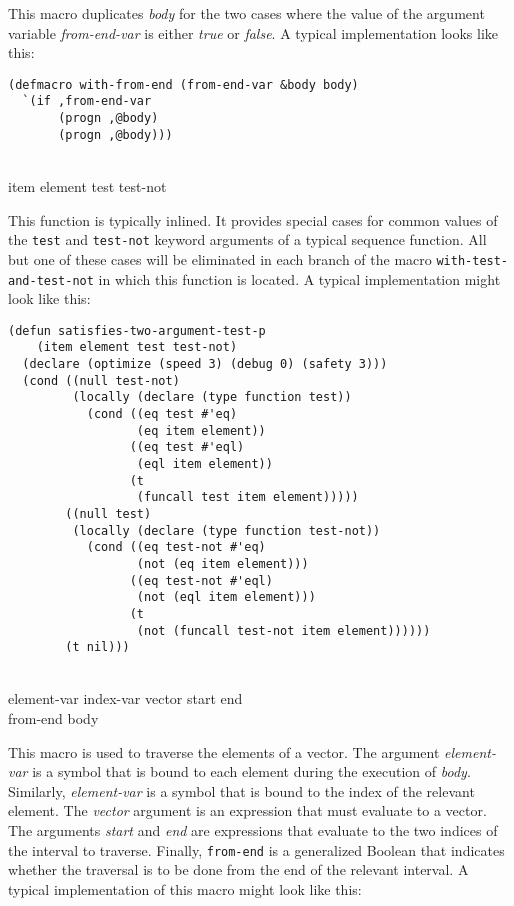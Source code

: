 This macro duplicates \textit{body} for the two cases where the value
of the argument variable \textit{from-end-var} is either \emph{true}
or \emph{false}.  A typical implementation looks like this:

{\small\begin{verbatim}
(defmacro with-from-end (from-end-var &body body)
  `(if ,from-end-var
       (progn ,@body)
       (progn ,@body)))
\end{verbatim}}
\noindent
{}\\
{item element test test-not}

This function is typically inlined.  It provides special cases for
common values of the \texttt{test} and \texttt{test-not} keyword
arguments of a typical sequence function.  All but one of these cases
will be eliminated in each branch of the macro
\texttt{with-test-and-test-not} in which this function is located.  A
typical implementation might look like this:

{\small\begin{verbatim}
(defun satisfies-two-argument-test-p
    (item element test test-not)
  (declare (optimize (speed 3) (debug 0) (safety 3)))
  (cond ((null test-not)
         (locally (declare (type function test))
           (cond ((eq test #'eq)
                  (eq item element))
                 ((eq test #'eql)
                  (eql item element))
                 (t
                  (funcall test item element)))))
        ((null test)
         (locally (declare (type function test-not))
           (cond ((eq test-not #'eq)
                  (not (eq item element)))
                 ((eq test-not #'eql)
                  (not (eql item element)))
                 (t
                  (not (funcall test-not item element))))))
        (t nil)))
\end{verbatim}}
\noindent
{}\\
{element-var index-var vector start end\\
from-end \body body}

This macro is used to traverse the elements of a vector.  The argument
\textit{element-var} is a symbol that is bound to each element during
the execution of \textit{body}.  Similarly, \textit{element-var} is a
symbol that is bound to the index of the relevant element.  The
\textit{vector} argument is an expression that must evaluate to a
vector.  The arguments \textit{start} and \textit{end} are expressions
that evaluate to the two indices of the interval to traverse.
Finally, \texttt{from-end} is a generalized Boolean that indicates
whether the traversal is to be done from the end of the relevant
interval.  A typical implementation of this macro might look like
this:

